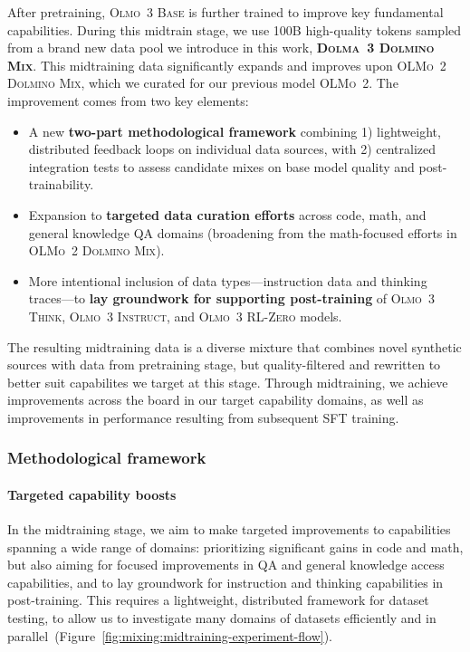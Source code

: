 \documentclass[table]{ai2style/ai2}
\newcommand{\oldOlmo}{OLMo\xspace}
\newcommand{\newOlmo}{Olmo\xspace}
\newcommand{\olmotoo}{\textsc{\oldOlmo~2}\xspace}
\newcommand{\olmothreebase}{\textsc{\newOlmo~3 Base}\xspace}
\newcommand{\olmothreeinstruct}{\textsc{\newOlmo~3 Instruct}\xspace}
\newcommand{\olmothreerlzero}{\textsc{\newOlmo~3 RL-Zero}\xspace}
\newcommand{\olmothreethinking}{\textsc{Olmo~3 Think}\xspace}
\newcommand{\dolminos}{\textsc{\oldOlmo~2 Dolmino Mix}\xspace}
\newcommand{\dolminostoo}{\textsc{Dolma~3 Dolmino Mix}\xspace}
\begin{document}
After pretraining, \olmothreebase is further trained to improve key fundamental capabilities. 
During this midtrain stage, we use 100B high-quality tokens sampled from a brand new data pool we introduce in this work, {\bf \dolminostoo}. This midtraining data significantly expands and improves upon \dolminos, which we curated for our previous model \olmotoo.
The improvement comes from two key elements:
\begin{itemize}
    \item A new {\bf two-part methodological framework} combining 1) lightweight, distributed feedback loops on individual data sources, with 2) centralized integration tests to assess candidate mixes on base model quality and post-trainability.
    \item Expansion to {\bf targeted data curation efforts} across code, math, and general knowledge QA domains (broadening from the math-focused efforts in \dolminos).
    \item More intentional inclusion of data types---instruction data and thinking traces---to {\bf lay groundwork for supporting post-training} of \olmothreethinking, \olmothreeinstruct, and \olmothreerlzero models.
\end{itemize}

The resulting midtraining data is a diverse mixture that combines novel synthetic sources with data from pretraining stage, but quality-filtered and rewritten to better suit capabilites we target at this stage.
Through midtraining, we achieve improvements across the board in our target capability domains, as well as improvements in performance resulting from subsequent SFT training.

\subsubsection{Methodological framework}\label{sec:midtraining-methods}

\paragraph{Targeted capability boosts}
In the midtraining stage, we aim to make targeted improvements to capabilities spanning a wide range of domains: prioritizing significant gains in code and math, but also aiming for focused improvements in QA and general knowledge access capabilities, and to lay groundwork for instruction and thinking capabilities in post-training. 
This requires a lightweight, distributed framework for dataset testing, to allow us to investigate many domains of datasets efficiently and in parallel~(Figure~\ref{fig:mixing:midtraining-experiment-flow}).
\end{document}
